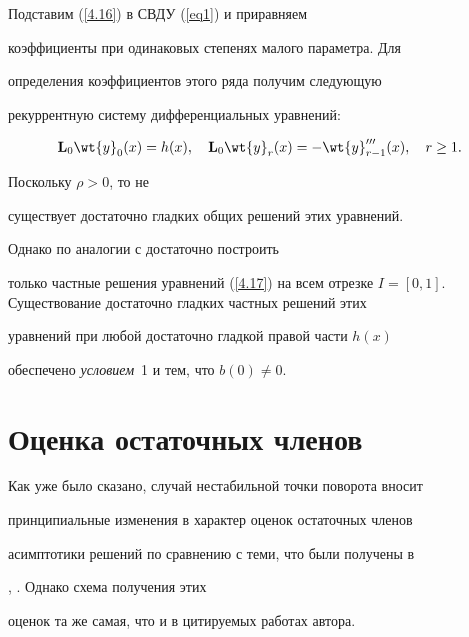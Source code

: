 Подставим (\ref{4.16}) в СВДУ (\ref{eq1}) и приравняем


коэффициенты при одинаковых степенях малого параметра. Для


определения коэффициентов этого ряда получим следующую


рекуррентную систему дифференциальных уравнений:


\begin{equation}


\label{4.17}


\bold{L}_0 \wt{y}_{0} (x) = h (x), \quad


\bold{L}_0 \wt{y}_{r} (x) = - \wt{y}_{r - 1} ''' (x),


\quad r \geq 1.


\end{equation}


Поскольку $\rho>0$, то не


существует достаточно гладких общих решений этих уравнений.


Однако по аналогии с \cite{Bobochko2} достаточно построить


только частные решения уравнений (\ref{4.17}) на всем отрезке $I =


[0,1]$. Существование достаточно гладких частных решений этих


уравнений при любой достаточно гладкой правой части $ h (x)$


обеспечено {\it условием}~1 и тем, что $b(0)\neq 0$.








\section{Оценка остаточных членов}





Как уже было сказано, случай нестабильной точки поворота вносит


принципиальные изменения в характер оценок остаточных членов


асимптотики решений по сравнению с теми, что были получены в


\cite{Bobochko1}, \cite{Bobochko2}. Однако схема получения этих


оценок та же самая, что и в цитируемых работах автора.





